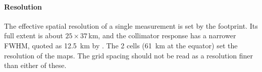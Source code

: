 \paragraph{Resolution} The effective spatial resolution of a single measurement is set by the footprint. Its full extent is about $25\times37$\,km, and the collimator response has a narrower FWHM, quoted as \SI{12.5}{km} by \citet{Pillai2021}. The 2\textdegree{} cells (\SI{61}{km} at the equator) set the resolution of the maps. The grid spacing should not be read as a resolution finer than either of these.
